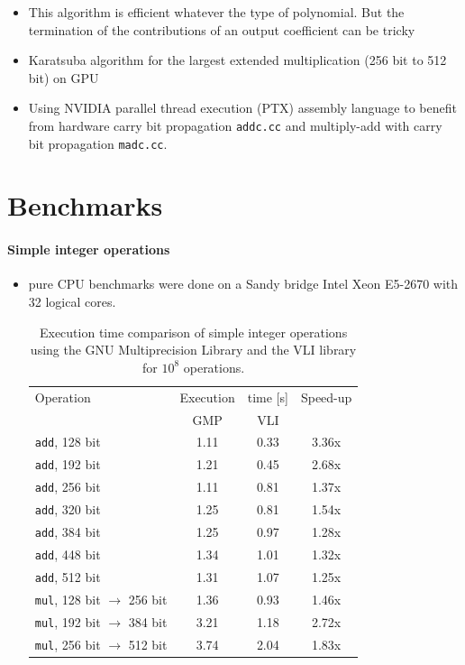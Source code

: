 \documentclass[oribibl]{llncs2e/llncs}
\begin{document}
\begin{itemize}
\item {\color{blue} This algorithm is efficient whatever the type of polynomial. But the termination of the contributions of an output coefficient can be tricky}
\item {\color{blue}  Karatsuba algorithm \cite{Karatsuba1963} for the largest extended multiplication (256 bit to 512 bit) on GPU}
\item Using NVIDIA parallel thread execution (PTX) assembly language to benefit from hardware carry bit propagation \verb|addc.cc| and multiply-add with carry bit propagation \verb|madc.cc|.
\end{itemize}

\section{Benchmarks}
\paragraph{Simple integer operations}
\begin{itemize}
\item pure CPU benchmarks were done on a Sandy bridge Intel Xeon E5-2670 with 32 logical cores.
\begin{table}
    \begin{center}
    \begin{tabular}{l|cc|c}
     Operation & Execution & time [s] & Speed-up\\
       & GMP & VLI & \\
     \hline
    \verb|add|, 128 bit & 1.11 & 0.33 & 3.36x \\
    \verb|add|, 192 bit & 1.21 & 0.45 & 2.68x \\
    \verb|add|, 256 bit & 1.11 & 0.81 & 1.37x \\
    \verb|add|, 320 bit & 1.25 & 0.81 & 1.54x \\
    \verb|add|, 384 bit & 1.25 & 0.97 & 1.28x \\
    \verb|add|, 448 bit & 1.34 & 1.01 & 1.32x \\
    \verb|add|, 512 bit & 1.31 & 1.07 & 1.25x \\
    \hline
    \verb|mul|, 128 bit $\rightarrow$ 256 bit & 1.36 & 0.93 & 1.46x \\
    \verb|mul|, 192 bit $\rightarrow$ 384 bit & 3.21 & 1.18 & 2.72x \\
    \verb|mul|, 256 bit $\rightarrow$ 512 bit & 3.74 & 2.04 & 1.83x \\ 
    \end{tabular}
    \caption{Execution time comparison of simple integer operations using the GNU Multiprecision Library and the VLI library for $10^8$ operations.}
    \end{center}
\end{table}
\end{itemize}
\end{document}
